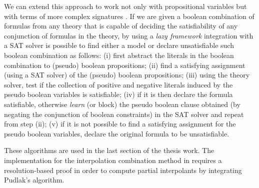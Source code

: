 We can extend this approach to work not only with propositional
variables but with terms of more complex signatures 
\cite{10.5555/1391237}. If we are given a boolean combination 
of formulas from any theory that is capable of deciding the 
satisfiability of any conjunction of formulas in the theory, 
by using a \emph{lazy framework} integration with a SAT solver is 
possible to find either a model or declare unsatisfiable such boolean
combination as follows: (i) first abstract the literals in the boolean
combination to (pseudo) boolean propositions; (ii) find a satisfying
assignment (using a SAT solver) of the (pseudo) boolean propositions;
(iii) using the theory solver, test if the collection of positive
and negative literals induced by the pseudo boolean variables is
satisfiable; (iv) if it is then declare the formula satisfiable, 
otherwise \emph{learn} (or block) the pseudo boolean clause obtained
(by negating the conjunction of boolean constraints) in the SAT
solver and repeat from step (ii); (v) if it is not possible to
find a satisfying assignment for the pseudo boolean variables, 
declare the original formula to be unsatisfiable.

These algorithms are used in the last section of the thesis work.
The implementation for the interpolation combination method
in \cite{10.1007/11532231_26} requires a resolution-based
proof in order to compute partial interpolants by integrating
Pudlak's algorithm.

